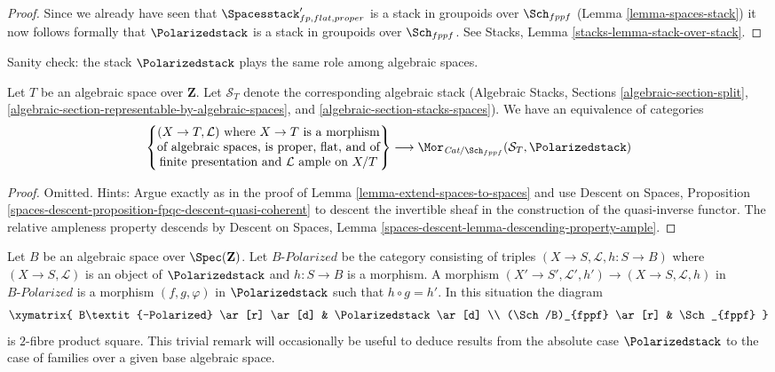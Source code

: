 \begin{proof}
\medskip\noindent
Since we already have seen that $\Spacesstack'_{fp, flat, proper}$
is a stack in groupoids over $\Sch_{fppf}$
(Lemma \ref{lemma-spaces-stack}) it now follows formally
that $\Polarizedstack$ is a stack in groupoids over $\Sch_{fppf}$.
See Stacks, Lemma \ref{stacks-lemma-stack-over-stack}.
\end{proof}

\noindent
Sanity check: the stack $\Polarizedstack$ plays
the same role among algebraic spaces.

\begin{lemma}
\label{lemma-extend-polarized-to-spaces}
Let $T$ be an algebraic space over $\mathbf{Z}$. Let $\mathcal{S}_T$
denote the corresponding algebraic stack (Algebraic Stacks, Sections
\ref{algebraic-section-split},
\ref{algebraic-section-representable-by-algebraic-spaces}, and
\ref{algebraic-section-stacks-spaces}).
We have an equivalence of categories
$$
\left\{
\begin{matrix}
(X \to T, \mathcal{L})\text{ where }X \to T\text{ is a morphism}\\
\text{of algebraic spaces, is proper, flat, and of}\\
\text{finite presentation and }\mathcal{L}\text{ ample on }X/T
\end{matrix}
\right\}
\longrightarrow
\Mor_{\textit{Cat}/\Sch_{fppf}}(\mathcal{S}_T, \Polarizedstack)
$$
\end{lemma}

\begin{proof}
Omitted. Hints: Argue exactly as in the proof of
Lemma \ref{lemma-extend-spaces-to-spaces} and use
Descent on Spaces, Proposition
\ref{spaces-descent-proposition-fpqc-descent-quasi-coherent}
to descent the invertible sheaf in the construction
of the quasi-inverse functor. The relative ampleness property descends
by Descent on Spaces, Lemma
\ref{spaces-descent-lemma-descending-property-ample}.
\end{proof}

\begin{remark}
\label{remark-polarized-base-change}
Let $B$ be an algebraic space over $\Spec(\mathbf{Z})$.
Let $B\textit{-Polarized}$ be the category consisting
of triples $(X \to S, \mathcal{L}, h : S \to B)$
where $(X \to S, \mathcal{L})$ is an object of
$\Polarizedstack$ and $h : S \to B$ is a morphism.
A morphism $(X' \to S', \mathcal{L}', h') \to (X \to S, \mathcal{L}, h)$
in $B\textit{-Polarized}$ is a morphism $(f, g, \varphi)$
in $\Polarizedstack$ such that $h \circ g = h'$.
In this situation the diagram
$$
\xymatrix{
B\textit{-Polarized} \ar[r] \ar[d] & \Polarizedstack \ar[d] \\
(\Sch/B)_{fppf} \ar[r] & \Sch_{fppf}
}
$$
is $2$-fibre product square. This trivial remark
will occasionally be useful to deduce results from
the absolute case $\Polarizedstack$ to the case
of families over a given base algebraic space.
\end{remark}

